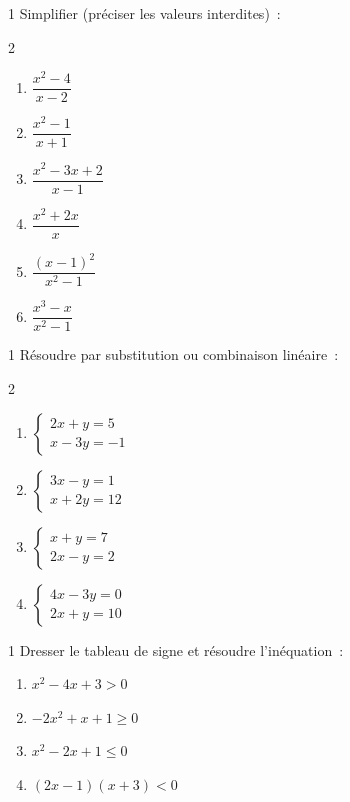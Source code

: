 \begin{exo}{1}
Simplifier (pr\'eciser les valeurs interdites)~:
\begin{multicols}{2}
\begin{enumerate}
  \item $\dfrac{x^2-4}{x-2}$
  \item $\dfrac{x^2-1}{x+1}$
  \item $\dfrac{x^2-3x+2}{x-1}$
  \item $\dfrac{x^2+2x}{x}$
  \item $\dfrac{(x-1)^2}{x^2-1}$
  \item $\dfrac{x^3-x}{x^2-1}$
\end{enumerate}
\end{multicols}
\end{exo}

\begin{exo}{1}
R\'esoudre par substitution ou combinaison lin\'eaire~:
\begin{multicols}{2}
\begin{enumerate}
  \item $\begin{cases}2x + y = 5\\x - 3y = -1\end{cases}$
  \item $\begin{cases}3x - y = 1\\x + 2y = 12\end{cases}$
  \item $\begin{cases}x + y = 7\\2x - y = 2\end{cases}$
  \item $\begin{cases}4x - 3y = 0\\2x + y = 10\end{cases}$
\end{enumerate}
\end{multicols}
\end{exo}

\begin{exo}{1}
Dresser le tableau de signe et r\'esoudre l'in\'equation~:
\begin{enumerate}
  \item $x^2 - 4x + 3 > 0$
  \item $-2x^2 + x + 1 \geq 0$
  \item $x^2 - 2x + 1 \leq 0$
  \item $(2x-1)(x+3) < 0$
\end{enumerate}
\end{exo}

